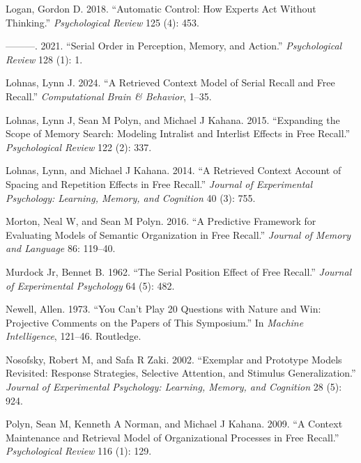 \documentclass[
  letterpaper,
  11pt,
  english,
  singlespacing,
  headsepline]{MastersDoctoralThesis}
\newlength{\cslhangindent}
\newenvironment{CSLReferences}[2] %
 {\begin{list}{}{%
  \setlength{\itemindent}{0pt}
  \setlength{\leftmargin}{0pt}
  \setlength{\parsep}{0pt}
  \ifodd #1
   \setlength{\leftmargin}{\cslhangindent}
   \setlength{\itemindent}{-1\cslhangindent}
  \fi
  \setlength{\itemsep}{#2\baselineskip}}}
 {\end{list}}
\begin{document}
\begin{CSLReferences}{1}{0}
Logan, Gordon D. 2018. {``Automatic Control: How Experts Act Without
Thinking.''} \emph{Psychological Review} 125 (4): 453.

---------. 2021. {``Serial Order in Perception, Memory, and Action.''}
\emph{Psychological Review} 128 (1): 1.

Lohnas, Lynn J. 2024. {``A Retrieved Context Model of Serial Recall and
Free Recall.''} \emph{Computational Brain \& Behavior}, 1--35.

Lohnas, Lynn J, Sean M Polyn, and Michael J Kahana. 2015. {``Expanding
the Scope of Memory Search: Modeling Intralist and Interlist Effects in
Free Recall.''} \emph{Psychological Review} 122 (2): 337.

Lohnas, Lynn, and Michael J Kahana. 2014. {``A Retrieved Context Account
of Spacing and Repetition Effects in Free Recall.''} \emph{Journal of
Experimental Psychology: Learning, Memory, and Cognition} 40 (3): 755.

Morton, Neal W, and Sean M Polyn. 2016. {``A Predictive Framework for
Evaluating Models of Semantic Organization in Free Recall.''}
\emph{Journal of Memory and Language} 86: 119--40.

Murdock Jr, Bennet B. 1962. {``The Serial Position Effect of Free
Recall.''} \emph{Journal of Experimental Psychology} 64 (5): 482.

Newell, Allen. 1973. {``You Can't Play 20 Questions with Nature and Win:
Projective Comments on the Papers of This Symposium.''} In \emph{Machine
Intelligence}, 121--46. Routledge.

Nosofsky, Robert M, and Safa R Zaki. 2002. {``Exemplar and Prototype
Models Revisited: Response Strategies, Selective Attention, and Stimulus
Generalization.''} \emph{Journal of Experimental Psychology: Learning,
Memory, and Cognition} 28 (5): 924.

Polyn, Sean M, Kenneth A Norman, and Michael J Kahana. 2009. {``A
Context Maintenance and Retrieval Model of Organizational Processes in
Free Recall.''} \emph{Psychological Review} 116 (1): 129.


\end{CSLReferences}
\end{document}
